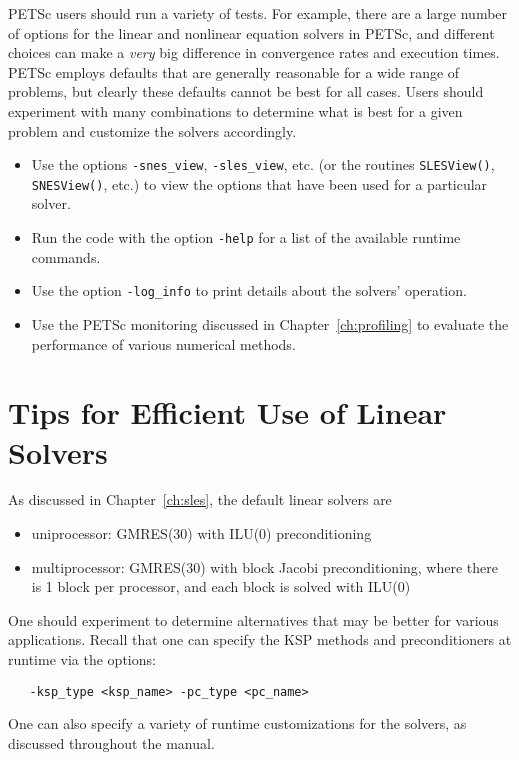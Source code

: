 PETSc users should run a variety of tests.  For example, there are a large number of options 
for the linear and nonlinear equation solvers in PETSc, and different 
choices can make a {\em very} big difference in convergence rates and execution 
times.  PETSc employs defaults that are generally reasonable for a wide
range of problems, but clearly these defaults cannot be best for all
cases.  Users should experiment with many combinations to determine 
what is best for a given problem and customize the solvers accordingly.
\begin{itemize}
\item Use the options {\tt -snes\_view}, {\tt -sles\_view}, etc. (or the routines 
     {\tt SLESView()}, {\tt SNESView()}, etc.) to view the options that have been
     used for a particular solver.
\item Run the code with the option {\tt -help} for a list of the available 
     runtime commands.
\item Use the option {\tt -log\_info} to print details about the solvers' operation.
\item Use the PETSc monitoring discussed in Chapter~\ref{ch:profiling}
     to evaluate the performance of various numerical methods.
\end{itemize}

\section{Tips for Efficient Use of Linear Solvers}
\label{sec:slestips}

As discussed in Chapter~\ref{ch:sles}, the default linear solvers are
\begin{itemize}
\item uniprocessor: GMRES(30) with ILU(0) preconditioning\\
\item multiprocessor: GMRES(30) with block Jacobi preconditioning, where there
                     is 1 block per processor, and each block is solved with ILU(0)\\
\end{itemize}
One should experiment to determine alternatives that may be better for
various applications.  Recall that one can specify the KSP methods and
preconditioners at runtime via the options:
\begin{verbatim}
   -ksp_type <ksp_name> -pc_type <pc_name>
\end{verbatim}
One can also specify a variety of runtime customizations for the
solvers, as discussed throughout the manual.

